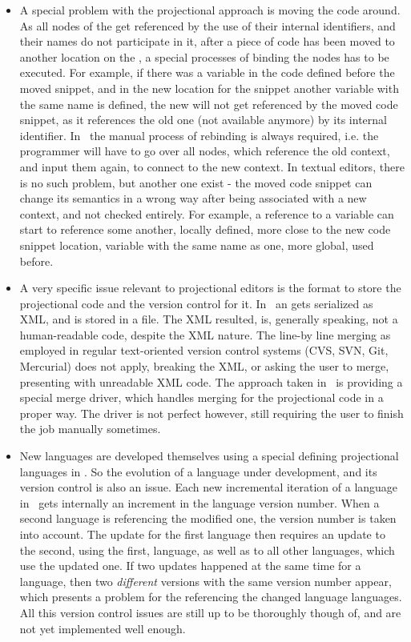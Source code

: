  \begin{itemize}
  \item A special problem with the projectional approach is moving the code around. As all nodes of the  get referenced by the use of their
  internal identifiers, and their names do not participate in it, after a piece of code has been moved to another location on the , 
  a special processes of binding the nodes has to be executed. For example, if there was a variable  in the code defined before the moved snippet,
  and in the new location for the snippet another variable with the same name  is defined, the new  will not get referenced by the 
  moved code snippet, as it references the old one (not available anymore) by its internal identifier. In \jbmps\ the manual process of rebinding is
  always required, i.e. the programmer will have to go over all nodes, which reference the old context, and input them again, to connect to the
  new context. In textual editors, there is no such problem, but another one exist - the moved code snippet can change its semantics in a wrong way
  after being associated with a new context, and not checked entirely. For example, a reference to a variable can start to reference some another, 
  locally defined, more close to the new code snippet location, variable with the same name as one, more global, used before. 
  
  \item  A very specific issue relevant to projectional editors is the format to store the projectional code and the version control for it.
  In \jbmps\ an  gets serialized as XML, and is stored in a file. The XML resulted, is, generally speaking, not a human-readable 
  code, despite the XML nature. The line-by line merging as employed in regular text-oriented version control systems (CVS, SVN, Git, Mercurial)
  does not apply, breaking the XML, or asking the user to merge, presenting with unreadable XML code. The approach taken in \jbmps\ is providing
  a special merge driver, which handles merging for the projectional code in a proper way. The driver is not perfect however, still requiring 
  the user to finish the job manually sometimes. 
  
  \item  New languages are developed themselves using a special defining projectional languages in \jbmps. So the evolution of a language under development,
  and its version control is also an issue. Each new incremental iteration of a language in \jbmps\ gets internally an increment in the language
  version number. When a second language is referencing the modified one, the version number is taken into account. The update for the first language
  then requires an update to the second, using the first,  language, as well as to all other languages, which use the updated one. If two updates happened
  at the same time for a language, then two \emph{different} versions with the same version number appear, which presents a problem for the 
  referencing the changed language languages. All this version control issues are still up to be thoroughly though of, and are not yet 
  implemented well enough.


\end{itemize}
